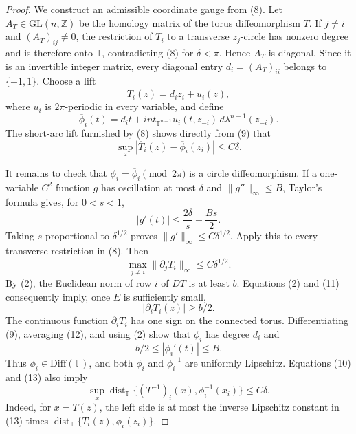 \documentclass{article}
\begin{document}
\begin{proof}
We construct an admissible coordinate gauge from (8).  Let \(A_T\in\mathrm{GL}(n,\mathbb Z)\) be the homology matrix of the torus diffeomorphism \(T\).  If \(j\ne i\) and \((A_T)_{ij}\ne0\), the restriction of \(T_i\) to a transverse \(z_j\)-circle has nonzero degree and is therefore onto \(\mathbb T\), contradicting (8) for \(\delta<\pi\).  Hence \(A_T\) is diagonal.  Since it is an invertible integer matrix, every diagonal entry \(d_i=(A_T)_{ii}\) belongs to \(\{-1,1\}\).  Choose a lift
\[
\overline T_i(z)=d_i z_i+u_i(z),
\]
where \(u_i\) is \(2\pi\)-periodic in every variable, and define
\[
\overline\phi_i(t)=d_i t+int_{\mathbb T^{n-1}}u_i(t,z_{-i})\,d\lambda^{n-1}(z_{-i}).
\tag{9}
\]
The short-arc lift furnished by (8) shows directly from (9) that
\[
\sup_z|\overline T_i(z)-\overline\phi_i(z_i)|\leq C\delta.
\tag{10}
\]

It remains to check that \(\phi_i=\overline\phi_i\pmod{2\pi}\) is a circle diffeomorphism.  If a one-variable \(C^2\) function \(g\) has oscillation at most \(\delta\) and \(\lVert g''\rVert_\infty\leq B\), Taylor's formula gives, for \(0<s<1\),
\[
|g'(t)|\leq \frac{2\delta}{s}+\frac{B s}{2}.
\]
Taking \(s\) proportional to \(\delta^{1/2}\) proves \(\lVert g'\rVert_\infty\leq C\delta^{1/2}\).  Apply this to every transverse restriction in (8).  Then
\[
\max_{j\ne i}\lVert\partial_jT_i\rVert_\infty\leq C\delta^{1/2}.
\tag{11}
\]
By (2), the Euclidean norm of row \(i\) of \(DT\) is at least \(b\).  Equations (2) and (11) consequently imply, once \(E\) is sufficiently small,
\[
|\partial_iT_i(z)|\geq b/2.
\tag{12}
\]
The continuous function \(\partial_iT_i\) has one sign on the connected torus.  Differentiating (9), averaging (12), and using (2) show that \(\phi_i\) has degree \(d_i\) and
\[
b/2\leq|\phi_i'(t)|\leq B.
\tag{13}
\]
Thus \(\phi_i\in\mathrm{Diff}(\mathbb T)\), and both \(\phi_i\) and \(\phi_i^{-1}\) are uniformly Lipschitz.  Equations (10) and (13) also imply
\[
\sup_x\operatorname{dist}_{\mathbb T}
\{(T^{-1})_i(x),\phi_i^{-1}(x_i)\}
\leq C\delta.
\tag{14}
\]
Indeed, for \(x=T(z)\), the left side is at most the inverse Lipschitz constant in (13) times \(\operatorname{dist}_{\mathbb T}\{T_i(z),\phi_i(z_i)\}\).


\end{proof}
\end{document}
